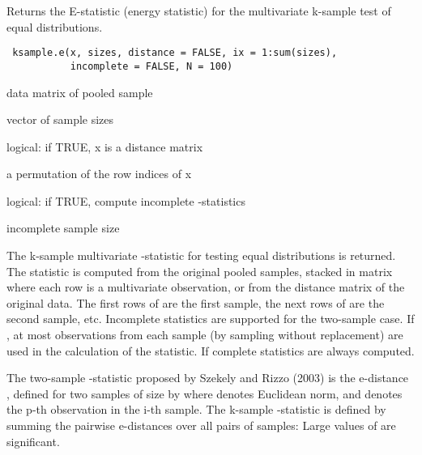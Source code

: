 \begin{Description}\relax
Returns the E-statistic (energy statistic)
for the multivariate k-sample test of equal distributions.
\end{Description}
\begin{Usage}
\begin{verbatim}
 ksample.e(x, sizes, distance = FALSE, ix = 1:sum(sizes), 
           incomplete = FALSE, N = 100)
\end{verbatim}
\end{Usage}
\begin{Arguments}
\begin{ldescription}
\item[\code{x}] data matrix of pooled sample
\item[\code{sizes}] vector of sample sizes
\item[\code{distance}] logical: if TRUE, x is a distance matrix
\item[\code{ix}] a permutation of the row indices of x 
\item[\code{incomplete}] logical: if TRUE, compute incomplete -statistics
\item[\code{N}] incomplete sample size
\end{ldescription}
\end{Arguments}
\begin{Details}\relax
The k-sample multivariate -statistic for testing equal distributions
is returned. The statistic is computed from the original pooled samples, stacked in 
matrix  where each row is a multivariate observation, or from the distance 
matrix  of the original data. The
first  rows of  are the first sample, the next
 rows of  are the second sample, etc. Incomplete statistics are 
supported for the two-sample case. If
, at most  observations from each sample 
(by sampling without replacement) are used in the calculation of the statistic.
If  complete statistics are always computed.

The two-sample -statistic proposed by Szekely and Rizzo (2003)
is the e-distance , defined for two samples 
of size  by
where
\eqn{\|\cdot\|}{|| ||} denotes Euclidean norm, and  denotes the p-th observation in the i-th sample.  
The k-sample  
-statistic is defined by summing the pairwise e-distances over 
all  pairs 
of samples:
Large values of  are significant.\end{Details}
